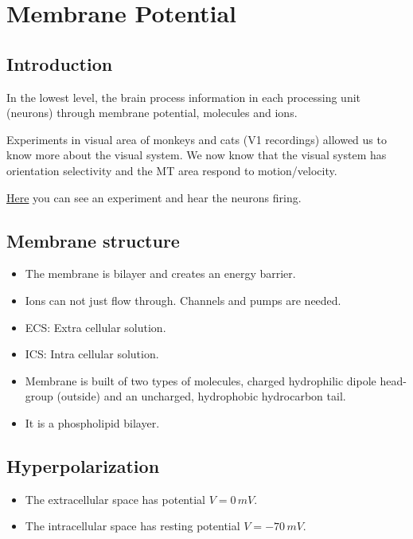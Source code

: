 \documentclass[main]{subfiles}
\begin{document}

\section{Membrane Potential}
\subsection{Introduction}
In the lowest level, the brain process information in each processing unit (neurons) through membrane potential, molecules and ions.

Experiments in visual area of monkeys and cats (V1 recordings) allowed us to know more about the visual system. We now know that the visual system has orientation selectivity and the MT area respond to motion/velocity.

\href{https://www.youtube.com/watch?v=8VdFf3egwfg}{Here} you can see an experiment and hear the neurons firing.

\subsection{Membrane structure}
\begin{itemize}[noitemsep,nolistsep]
	\item The membrane is bilayer and creates an energy barrier.
	\item Ions can not just flow through. Channels and pumps are needed.
	\item ECS: Extra cellular solution.
	\item ICS: Intra cellular solution.
	\item Membrane is built of two types of molecules, charged hydrophilic dipole head-group (outside) and an uncharged, hydrophobic hydrocarbon tail.
	\item It is a phospholipid bilayer.
\end{itemize}

\subsection{Hyperpolarization}
\begin{itemize}[noitemsep,nolistsep]
	\item The extracellular space has potential $V=0\,mV$.
	\item The intracellular space has resting potential $V=-70\,mV$.
\end{itemize}
\end{document}
